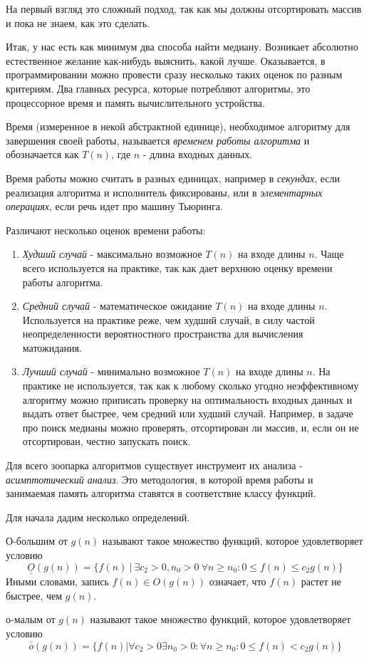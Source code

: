 \documentclass[../book.tex]{subfiles}
\begin{document}
	На первый взгляд это сложный подход, так как мы должны отсортировать массив и пока не знаем, как это сделать.
		
	Итак, у нас есть как минимум два способа найти медиану. Возникает абсолютно естественное желание как-нибудь выяснить, какой лучше. Оказывается, в программировании можно провести сразу несколько таких оценок по разным критериям. Два главных ресурса, которые потребляют алгоритмы, это процессорное время и память вычислительного устройства.
	
	\begin{definition}
		Время (измеренное в некой абстрактной единице), необходимое алгоритму для завершения своей работы, называется \textit{временем работы алгоритма} и обозначается как $T(n)$, где $n$ - длина входных данных.
	\end{definition}
	
	Время работы можно считать в разных единицах, например в \textit{секундах}, если реализация алгоритма и исполнитель фиксированы, или в \textit{элементарных операциях}, если речь идет про машину Тьюринга.
	
	Различают несколько оценок времени работы:
	\begin{enumerate}
		\item \textit{Худший случай} - максимально возможное $T(n)$ на входе длины $n$. Чаще всего используется на практике, так как дает верхнюю оценку времени работы алгоритма.
		\item \textit{Средний случай} - математическое ожидание $T(n)$ на входе длины $n$. Используется на практике реже, чем худший случай, в силу частой неопределенности вероятностного пространства для вычисления матожидания.
		\item \textit{Лучший случай} - минимально возможное $T(n)$ на входе длины $n$. На практике не используется, так как к любому сколько угодно неэффективному алгоритму можно приписать проверку на оптимальность входных данных и выдать ответ быстрее, чем средний или худший случай. Например, в задаче про поиск медианы можно проверять, отсортирован ли массив, и, если он не отсортирован, честно запускать поиск.
	\end{enumerate}
	
	Для всего зоопарка алгоритмов существует инструмент их анализа - \textit{асимптотический анализ}. Это методология, в которой время работы и занимаемая память алгоритма ставятся в соответствие классу функций.
	
	Для начала дадим несколько определений.
	\begin{definition}
		О-большим от $g(n)$ называют такое множество функций, которое удовлетворяет условию
		\[
		\underline{\underline{O}}(g(n)) = \{f(n) \ | \ \exists c_2>0, n_0>0 \ \forall n\geqslant n_0: 0 \leqslant f(n) \leqslant c_2 g(n)\}
		\]
		Иными словами, запись $f(n) \in O(g(n)) $ означает, что $f(n)$ растет не быстрее, чем $g(n)$.
	\end{definition}
	\begin{definition}
		о-малым от $g(n)$  называют такое множество функций, которое удовлетворяет условию
		\[
		\overline{\overline{o}}(g(n)) = \{f(n)|\forall c_2>0\exists n_0>0:\forall n \geqslant  n_0: 0 \leqslant f(n) < c_2 g(n)\}
		\]
	\end{definition}
	
\end{document}
